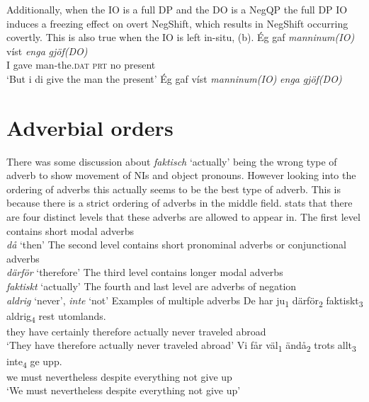 \documentclass[12pt, letterpaper]{article}
\begin{document}
\ex Additionally, when the IO is a full DP and the DO is a NegQP the full DP IO induces a freezing effect on overt NegShift, which results in NegShift occurring covertly. This is also true when the IO is left in-situ, (b).
	\ea 
	\gll Ég gaf \emph{manninum(IO)} víst \textit{enga} \textit{gjöf(DO)}\\
	I gave man-the.\textsc{dat} \textsc{prt} no present\\
	\glt `But i di give the man the present'
	\ex Ég gaf víst \textit{manninum(IO)} \textit{enga} \textit{gjöf(DO)}
	\z
\z 

\section{Adverbial orders} \label{sec:ADV}

\ea There was some discussion about \emph{faktisch} `actually' being the wrong type of adverb to show movement of NIs and object pronouns. 
\ex However looking into the ordering of adverbs this actually seems to be the best type of adverb. This is because there is a strict ordering of adverbs in the middle field. 
\ex \citet{holmesIntroductionSociolinguistics2017} stats that there are four distinct levels that these adverbs are allowed to appear in.
	\ea The first level contains short modal adverbs\\

	\emph{då} `then'
	\ex The second level contains short pronominal adverbs or conjunctional adverbs\\
	\emph{därför} `therefore'
	\ex The third level contains longer modal adverbs\\
	\emph{faktiskt} `actually'
	\ex The fourth and last level are adverbs of negation\\
	\emph{aldrig} `never', \emph{inte} `not'
	\z 
\ex Examples of multiple adverbs
	\ea
	\gll De har ju\textsubscript{1} därför\textsubscript{2} faktiskt\textsubscript{3} aldrig\textsubscript{4} rest utomlands.\\
	they have certainly therefore actually never traveled abroad\\
	\glt `They have therefore actually never traveled abroad'
	\ex
	\gll Vi får väl\textsubscript{1} ändå\textsubscript{2} {trots allt}\textsubscript{3} inte\textsubscript{4} ge upp.\\
	we must nevertheless despite everything not give up\\
	\glt `We must nevertheless despite everything not give up'
	\z
\z
\end{document}
